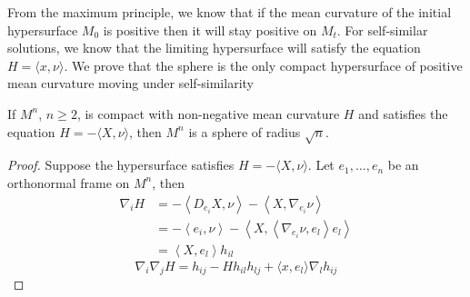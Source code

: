 From the maximum principle, we know that if the mean curvature of the initial hypersurface $M_0$ is positive then it will stay positive on $M_t$. 
For self-similar solutions, we know that the limiting hypersurface will satisfy the equation $H = \langle x, \nu \rangle$. 
We prove that the sphere is the only compact hypersurface of positive mean curvature moving under self-similarity 
\begin{thm}
If $M^n$, $n\ge 2$, is compact with non-negative mean curvature $H$ and satisfies the equation $H = - \langle X, \nu \rangle$, then $M^n$ is a sphere of radius $\sqrt{n}$. 
\end{thm}
\begin{proof}
Suppose the hypersurface satisfies $H = -\langle X, \nu \rangle$. Let $e_1,\ldots, e_n$ be an orthonormal frame on $M^n$, then 
\begin{align}
    \nabla_{i}H & = - \left< D_{e_{i}}X, \nu \right> - \left< X, \nabla_{e_{i}}\nu \right> \nonumber \\
    & = -\left< e_{i}, \nu \right> - \left< X, \left< \nabla_{e_{i}}\nu,e_{l} \right>e_{l} \right>\nonumber \\ 
    & = \left< X,e_{l} \right>h_{il}
\end{align}
\[\nabla_i \nabla_j H = h_{ij} - Hh_{il}h_{lj}+\langle x, e_l \rangle \nabla_l h_{ij}\]
\end{proof}
